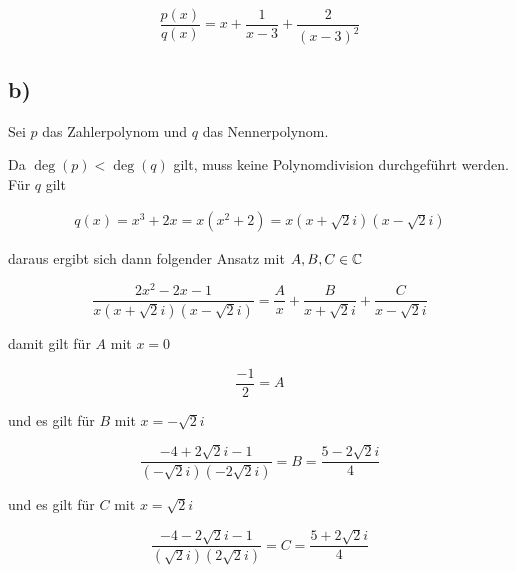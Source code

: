 \documentclass[a4paper, 11pt]{article}
\begin{document}
$$ \frac{p(x)}{q(x)} = x + \frac{1}{x - 3} + \frac{2}{(x - 3)^2} $$

\subsection{b)}
\label{sec:orgf8f8396}
Sei \(p\) das Zahlerpolynom und \(q\) das Nennerpolynom.

Da \(\deg(p) < \deg(q)\) gilt, muss keine Polynomdivision durchgeführt werden. \\
Für \(q\) gilt


\begin{align*}
    q(x) = x^3 + 2x = x(x^2 + 2) = x(x + \sqrt{2}i)(x - \sqrt{2}i)
\end{align*}

daraus ergibt sich dann folgender Ansatz mit \(A, B, C \in \mathbb{C}\)

$$ \frac{2x^2 - 2x - 1}{x(x + \sqrt{2}i)(x - \sqrt{2}i)} = \frac{A}{x} +
    \frac{B}{x + \sqrt{2}i} + \frac{C}{x - \sqrt{2}i} $$

damit gilt für \(A\) mit \(x = 0\)

$$ \frac{-1}{2} = A $$

und es gilt für \(B\) mit \(x = -\sqrt{2}i\)

$$ \frac{-4 + 2\sqrt{2}i - 1}{(-\sqrt{2}i)(-2\sqrt{2}i)} = B = \frac{5 - 2\sqrt{2}i}{4} $$

und es gilt für \(C\) mit \(x = \sqrt{2}i\)

$$ \frac{-4 - 2\sqrt{2}i - 1}{(\sqrt{2}i)(2\sqrt{2}i)} = C = \frac{5 + 2\sqrt{2}i}{4} $$
\end{document}
